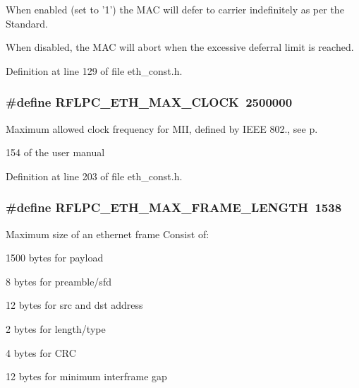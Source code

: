 When enabled (set to ’1’) the M\-A\-C will defer to carrier indefinitely as per the Standard. 

When disabled, the M\-A\-C will abort when the excessive deferral limit is reached. 

Definition at line 129 of file eth\-\_\-const.\-h.

\hypertarget{group__eth_ga379519025dad85582152eaf75f1d74fe}{
\subsubsection[{R\-F\-L\-P\-C\-\_\-\-E\-T\-H\-\_\-\-M\-A\-X\-\_\-\-C\-L\-O\-C\-K}]{\setlength{\rightskip}{0pt plus 5cm}\#define {\bf R\-F\-L\-P\-C\-\_\-\-E\-T\-H\-\_\-\-M\-A\-X\-\_\-\-C\-L\-O\-C\-K}~2500000}}\label{group__eth_ga379519025dad85582152eaf75f1d74fe}


Maximum allowed clock frequency for M\-I\-I, defined by I\-E\-E\-E 802., see p. 

154 of the user manual 

Definition at line 203 of file eth\-\_\-const.\-h.

\hypertarget{group__eth_gabdb5479a16aa9c77c6954bed00ffeef2}{
\subsubsection[{R\-F\-L\-P\-C\-\_\-\-E\-T\-H\-\_\-\-M\-A\-X\-\_\-\-F\-R\-A\-M\-E\-\_\-\-L\-E\-N\-G\-T\-H}]{\setlength{\rightskip}{0pt plus 5cm}\#define {\bf R\-F\-L\-P\-C\-\_\-\-E\-T\-H\-\_\-\-M\-A\-X\-\_\-\-F\-R\-A\-M\-E\-\_\-\-L\-E\-N\-G\-T\-H}~1538}}\label{group__eth_gabdb5479a16aa9c77c6954bed00ffeef2}


Maximum size of an ethernet frame Consist of\-: 


\begin{DoxyItemize}
\item 1500 bytes for payload
\item 8 bytes for preamble/sfd
\item 12 bytes for src and dst address
\item 2 bytes for length/type
\item 4 bytes for C\-R\-C
\item 12 bytes for minimum interframe gap 
\end{DoxyItemize}

